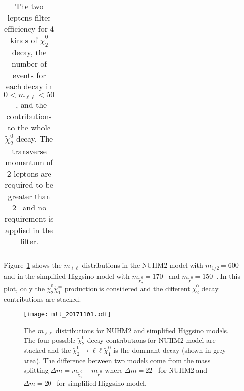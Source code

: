 \begin{table}[htb]
\begin{center}
{\begin{tabular}{lccccc}
                \hline
                \hline
            \end{tabular}
        }
    \end{center}
    \caption{The two leptons filter efficiency for 4 kinds of $\widetilde{\chi}^{0}_{2}$ decay, the number of events for each decay in $0 < m_{\ell\ell} < 50$~{\GeV}, and the contributions to the whole $\tilde{\chi}^{0}_{2}$ decay.
    The transverse momentum of 2 leptons are required to be greater than 2~{\GeV} and no \met requirement is applied in the filter.}
    \label{tab:data_nuhm2_n2_decay_efficiency_and_percentage}
\end{table}%

Figure~\ref{fig:data_mll_distribution} shows the $m_{\ell \ell}$ distributions in the NUHM2 model with $m_{1/2} = 600$~{\GeV} and in the simplified Higgsino model with $m_{\widetilde{\chi}^{0}_{2}} = 170$~{\GeV} and $m_{\widetilde{\chi}^{0}_{1}} = 150$~{\GeV}.
In this plot, only the $\widetilde{\chi}^{0}_{2} \widetilde{\chi}^{\pm}_{1}$ production is considered and the different $\widetilde{\chi}^{0}_{2}$ decay contributions are stacked.

\begin{figure}[htbp]
    \begin{center}
        \texttt{[image: mll\_20171101.pdf]}
        \caption{The $m_{\ell \ell}$ distributions for NUHM2 and simplified Higgsino models.
        The four possible $\widetilde{\chi}^{0}_{2}$ decay contributions for NUHM2 model are stacked and the $\widetilde{\chi}^{0}_{2} \to \ell \ell \widetilde{\chi}^{0}_{1}$ is the dominant decay (shown in grey area).
        The difference between two models come from the mass splitting $\Delta m = m_{\widetilde{\chi}^{0}_{2}} - m_{\widetilde{\chi}^{0}_{1}}$ where $\Delta m = 22$~{\GeV} for NUHM2 and $\Delta m = 20$~{\GeV} for simplified Higgsino model.}
        \label{fig:data_mll_distribution}
    \end{center}
\end{figure}


